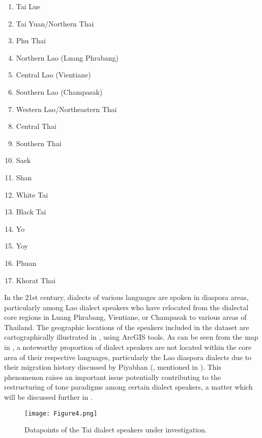\documentclass[output=paper]{langscibook}
\begin{document}
\begin{multicols}{2}
\begin{enumerate}
\item Tai Lue                          
\item Tai Yuan\slash Northern Thai         
\item Phu Thai                         
\item Northern Lao (Luang Phrabang)    
\item Central Lao (Vientiane)          
\item Southern Lao (Champasak)         
\item Western Lao\slash Northeastern Thai  
\item Central Thai                      
\item Southern Thai 
\item Saek
\item Shan
\item White Tai
\item Black Tai
\item Yo
\item Yoy
\item Phuan
\item Khorat Thai
\end{enumerate}
\end{multicols}

In the 21st century, dialects of various languages are spoken in diaspora areas, particularly among Lao dialect speakers who have relocated from the dialectal core regions in Luang Phrabang, Vientiane, or Champasak to various areas of Thailand. The geographic locations of the speakers included in the dataset are cartographically illustrated in , using ArcGIS tools. As can be seen from the map in , a noteworthy proportion of dialect speakers are not located within the core area of their respective languages, particularly the Lao diaspora dialects due to their migration history discussed by Piyabhan (\citeyear{Piyabhan1998}, mentioned in ). This phenomenon raises an important issue potentially contributing to the restructuring of tone paradigms among certain dialect speakers, a matter which will be discussed further in .


\begin{figure}    
\texttt{[image: Figure4.png]}
\caption{\label{fig:yurayong:4}Datapoints of the Tai dialect speakers under investigation.}
\end{figure}
\end{document}

